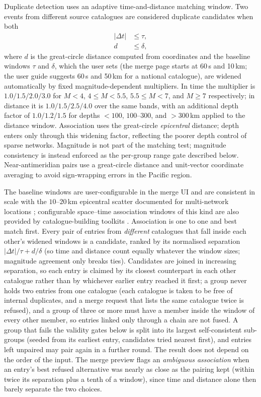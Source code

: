 \documentclass[12pt]{article}
\begin{document}
Duplicate detection uses an adaptive time-and-distance matching window.  Two
events from different source catalogues are considered duplicate candidates when
both
\begin{align}
  |\Delta t|     &\leq \tau, \label{eq:dt} \\
  d              &\leq \delta, \label{eq:dd}
\end{align}
where $d$ is the great-circle distance computed from coordinates and the baseline
windows $\tau$ and $\delta$, which the user sets (the merge page starts at
60\,s and 10\,km; the user guide suggests 60\,s and 50\,km for a national
catalogue), are widened automatically by fixed magnitude-dependent multipliers.  In time the multiplier is
$1.0/1.5/2.0/3.0$ for $M<4$, $4\leq M<5.5$, $5.5\leq M<7$, and $M\geq7$
respectively; in distance it is $1.0/1.5/2.5/4.0$ over the same bands, with an
additional depth factor of $1.0/1.2/1.5$ for depths $<100$, $100$--$300$, and
$>300$\,km applied to the distance window.  Association uses the great-circle
\emph{epicentral} distance; depth enters only through this widening factor,
reflecting the poorer depth control of sparse networks.  Magnitude is not part
of the matching test; magnitude consistency is instead enforced as the per-group
range gate described below.  Near-antimeridian pairs use a great-circle distance
and unit-vector coordinate averaging to avoid sign-wrapping errors in the
Pacific region.

The baseline windows are user-configurable in the merge UI and are consistent in
scale with the $10$--$20$\,km epicentral scatter documented for multi-network
locations \citep{engdahl1998}; configurable space--time association windows of
this kind are also provided by catalogue-building toolkits \citep{oqmbtk}.
Association is one to one and best match first.  Every pair of entries from
\emph{different} catalogues that fall inside each other's widened windows is a
candidate, ranked by its normalised separation $|\Delta t|/\tau + d/\delta$ (so
time and distance count equally whatever the window sizes; magnitude agreement
only breaks ties).  Candidates are joined in increasing separation, so each entry
is claimed by its closest counterpart in each other catalogue rather than by
whichever earlier entry reached it first; a group never holds two entries from
one catalogue (each catalogue is taken to be free of internal duplicates, and a
merge request that lists the same catalogue twice is refused), and a group of
three or more must have a member inside the window of every other
member, so entries linked only through a chain are not fused.  A group that fails
the validity gates below is split into its largest self-consistent sub-groups
(seeded from its earliest entry, candidates tried nearest first), and entries left
unpaired may pair again in a further round.  The result does not depend on the
order of the input.  The merge preview flags an \emph{ambiguous association}
when an entry's best refused alternative was nearly as close as the pairing kept
(within twice its separation plus a tenth of a window), since time and distance
alone then barely separate the two choices.
\end{document}
